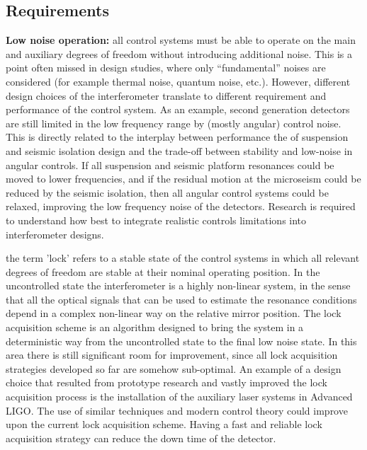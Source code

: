 \subsection{Requirements}
{\bf Low noise operation:} all control systems must be able to operate on the main and auxiliary degrees of freedom without introducing additional noise. This is a point often missed in design studies, where only ``fundamental'' noises are considered (for example thermal noise, quantum noise, etc.). However, different design choices of the interferometer translate to different requirement and performance of the control system. As an example, second generation detectors are still limited in the low frequency range by (mostly angular) control noise. This is directly related to the interplay between performance the of suspension and seismic isolation design and the trade-off between stability and low-noise in angular controls. If all suspension and seismic platform resonances could be moved to lower frequencies, and if the residual motion at the microseism could be reduced by the seismic isolation, then all angular control systems could be relaxed, improving the low frequency noise of the detectors. Research is required to understand how best to integrate realistic controls limitations into interferometer designs.\par
{} the term 'lock' refers to a stable state of the control systems in which all relevant degrees of freedom are stable at their nominal operating position. In the uncontrolled state the interferometer is a highly non-linear system, in the sense that all the optical signals that can be used to estimate the resonance conditions depend in a complex non-linear way on the relative mirror position. The lock acquisition scheme is an algorithm designed to bring the system in a deterministic way from the uncontrolled state to the final low noise state. In this area there is still significant room for improvement, since all lock acquisition strategies developed so far are somehow sub-optimal. An example of a design choice that resulted from prototype research and vastly improved the lock acquisition process is the installation of the auxiliary laser systems in Advanced LIGO. The use of similar techniques and modern control theory could improve upon the current lock acquisition scheme. Having a fast and reliable lock acquisition strategy can reduce the down time of the detector.\par
